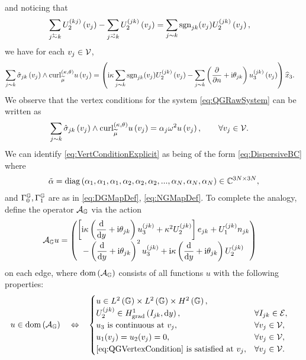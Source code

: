 and noticing that 
\begin{align*}
	\sum_{j\conRight k} U_2^{(kj)}\bracs{v_j} - \sum_{j\conLeft k} U_2^{(jk)}\bracs{v_j} &=
	\sum_{j\con k} \sgn_{jk}(v_j) U_2^{(jk)}\bracs{v_j},
\end{align*} 
we have for each $v_j\in\mathcal{V}$,
\begin{align*}
	\sum_{j\sim k} \hat{\sigma}_{jk}\left( v_j \right) \wedge \mathrm{curl}_{\widetilde{\mu}}^{\left( \kappa, \theta \right)}u\left( v_j \right)
	&= \left(  
	\mathrm{i}\kappa\sum_{j\sim k} \mathrm{sgn}_{jk}(v_j) U_2^{(jk)}\left( v_j \right)
	- \sum_{j\sim k}\left( \dfrac{\partial }{\partial n} + \mathrm{i}\theta_{jk} \right)u_3^{(jk)}\left( v_j \right)
	 \right) \widehat{x}_3.
\end{align*}
We observe that the vertex conditions for the system \eqref{eq:QGRawSystem} can be written as
\begin{align} \label{eq:VertConditionExplicit}
	\sum_{j\sim k} \hat{\sigma}_{jk}\left( v_j \right) \wedge \mathrm{curl}_{\widetilde{\mu}}^{\left( \kappa, \theta \right)}u\left( v_j \right)
	&= \alpha_j\omega^2 u\left( v_j \right),
	\qquad \forall v_j\in\mathcal{V}.
\end{align}
We can identify \eqref{eq:VertConditionExplicit} as being of the form \eqref{eq:DispersiveBC}  where
\begin{align*}
	\tilde{\alpha} = 
	\mathrm{diag}\left( \alpha_1, \alpha_1, \alpha_1, \alpha_2, \alpha_2, \alpha_2, ..., \alpha_N, \alpha_N, \alpha_N \right) \in \mathbb{C}^{3N\times 3N},
\end{align*}
and $\Gamma_0^{\mathbb{G}}, \Gamma_1^{\mathbb{G}}$ are as in \eqref{eq:DGMapDef}, \eqref{eq:NGMapDef}.
To complete the analogy, define the operator $\mathcal{A}_{\mathbb{G}}$ via the action
\begin{align*}
	\mathcal{A}_{\mathbb{G}} u &= 
	\begin{pmatrix}
		\left[  \mathrm{i}\kappa\left( \dfrac{\mathrm{d}}{\mathrm{d}y} + \mathrm{i}\theta_{jk}  \right)u_3^{(jk)} + \kappa^2 U_2^{(jk)}  \right]e_{jk}
		+ U_1^{(jk)} n_{jk} \\
		- \left( \dfrac{\mathrm{d}}{\mathrm{d}y} + \mathrm{i}\theta_{jk}  \right)^2 u_3^{(jk)} + \mathrm{i}\kappa \left( \dfrac{\mathrm{d}}{\mathrm{d}y} + \mathrm{i}\theta_{jk}  \right)U_2^{(jk)}
	\end{pmatrix}
\end{align*}
on each edge, where $\mathrm{dom}\left( \mathcal{A}_{\mathbb{G}} \right)$ consists of all functions $u$ with the following properties:
\begin{align*}
	u\in\mathrm{dom}\left( \mathcal{A}_{\mathbb{G}} \right) \quad\Leftrightarrow\quad &
	\begin{cases}
	u\in L^2\left( \mathbb{G} \right)\times L^2\left( \mathbb{G} \right)\times H^2\left( \mathbb{G} \right), \\
	U_2^{(jk)}\in H^1_\mathrm{grad}\left( I_{jk}, \mathrm{d}y \right), & \forall I_{jk}\in\mathcal{E}, \\
	u_3 \text{ is continuous at } v_j, & \forall v_j\in\mathcal{V}, \\
	u_1(v_j) = u_2(v_j) = 0, & \forall v_j\in\mathcal{V}, \\
	\text{\eqref{eq:QGVertexCondition} is satisfied at } v_j, & \forall v_j\in\mathcal{V}.
	\end{cases}
\end{align*}
